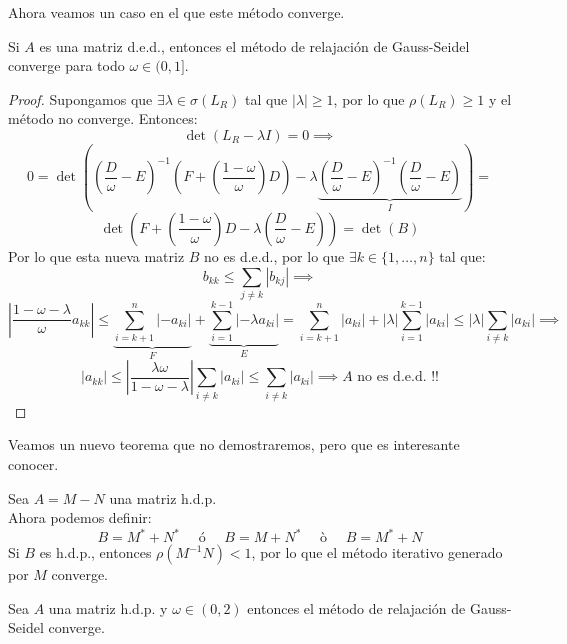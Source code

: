 Ahora veamos un caso en el que este método converge.

\begin{teorema}
    Si $A$ es una matriz d.e.d., entonces el método de relajación de Gauss-Seidel converge para todo $\omega \in (0,1]$.
\end{teorema}

\begin{proof}
    Supongamos que $\exists \lambda \in \sigma(L_R)$ tal que $|\lambda| \geq 1$, por lo que $\rho(L_R) \geq 1$ y el método no converge. Entonces:
    \[
        \det(L_R - \lambda I) =
        0 \implies
    \]
    \[
    0 =
    \det( \left(\frac{D}{\omega} - E \right)^{-1} \left( F + \left( \frac{1-\omega}{\omega} \right) D \right) - \lambda \underbrace{\left( \frac{D}{\omega} - E \right)^{-1} \left( \frac{D}{\omega} - E \right)}_{I} ) =
    \]
    \[
        \det( F + \left( \frac{1-\omega}{\omega} \right) D - \lambda \left( \frac{D}{\omega} - E \right) ) =
        \det( B )
    \]
    Por lo que esta nueva matriz $B$ no es d.e.d., por lo que $\exists k \in \{1, \dots, n\}$ tal que:
    \[
        b_{kk} \leq
        \sum_{j \neq k} |b_{kj}| \implies
    \]
    \[
        \left| \frac{1-\omega - \lambda}{\omega} a_{kk} \right| \leq
        \underbrace{\sum_{i = k + 1}^n |-a_{ki}|}_{F} + 
        \underbrace{\sum_{i = 1}^{k-1} |- \lambda a_{ki}|}_{E} =
        \sum_{i = k + 1}^n |a_{ki}| + |\lambda| \sum_{i = 1}^{k-1} |a_{ki}| \leq
        | \lambda | \sum_{i \neq k} |a_{ki}| \implies
    \]
    \[
        |a_{kk}| \leq
        \left| \frac{\lambda \omega}{1-\omega - \lambda} \right| \sum_{i \neq k} |a_{ki}| \leq
        \sum_{i \neq k} |a_{ki}| \implies
        A \text{ no es d.e.d. !!}
    \]
\end{proof}

Veamos un nuevo teorema que no demostraremos, pero que es interesante conocer.

\begin{teorema}
    Sea $A = M - N$ una matriz h.d.p.\\
    Ahora podemos definir:
    \[
        B = M^* + N^* \quad \text{ ó } \quad B = M + N^* \quad \text{ ò } \quad B = M^* + N
    \]
    Si $B$ es h.d.p., entonces $\rho(M^{-1}N) < 1$, por lo que el método iterativo generado por $M$ converge.
\end{teorema}

\begin{teorema}
    Sea $A$ una matriz h.d.p. y $\omega \in (0,2)$ entonces el método de relajación de Gauss-Seidel converge.
\end{teorema}


